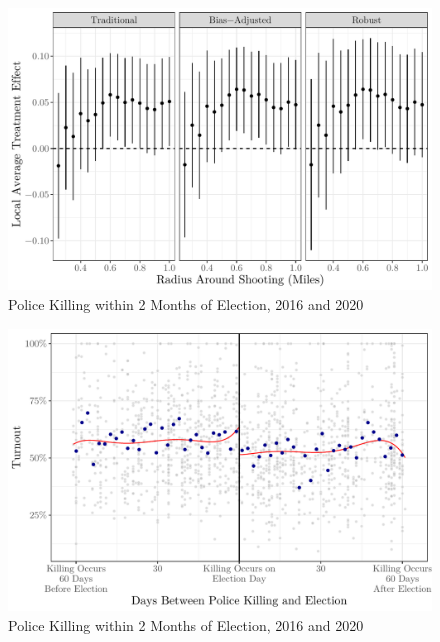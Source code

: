 \documentclass[
  12pt,
]{article}
\begin{document}
\begin{figure}[h]

{\centering \includegraphics{shoot_to_files/figure-latex/placebo-prior-1} 

}

\caption{\label{fig:map}Police Killing within 2 Months of Election, 2016 and 2020}\label{fig:placebo-prior}
\end{figure}

\begin{figure}[h]

{\centering \includegraphics{shoot_to_files/figure-latex/rd-plot-1} 

}

\caption{\label{fig:map}Police Killing within 2 Months of Election, 2016 and 2020}\label{fig:rd-plot}
\end{figure}
\end{document}
